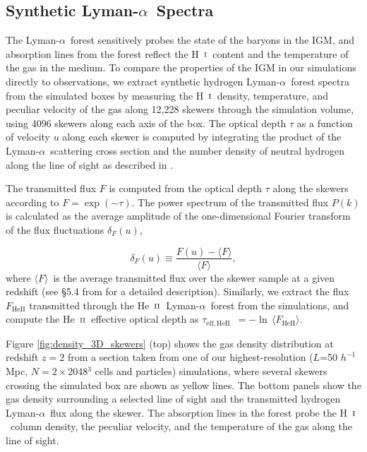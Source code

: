\documentclass[twocolumn]{aastex62}
\newcommand\Lya{Lyman-$\alpha$}
\def\HI{\hbox{\rm H~$\scriptstyle\rm I$}}
\def\HeII{\hbox{He~$\scriptstyle\rm II$}}
\newcommand\Fmean{$\langle F \rangle$~}
\newcommand\taueffHe{$\tau_{\mathrm{eff,HeII}}$~}
\begin{document}
\subsection{Synthetic \Lya\ Spectra }

The \Lya\ forest sensitively probes
the state of the baryons in the IGM, 
and
absorption lines from the forest reflect the \HI\ content and the temperature 
of the gas in the medium. To compare the properties of the IGM in our simulations directly to observations, we extract synthetic hydrogen \Lya\ forest spectra 
from the simulated boxes by measuring the \HI\ density, temperature, and peculiar velocity of the gas along 12,228 skewers through the simulation volume, 
using 4096 skewers along each axis of the box. The optical depth $\tau$ as a function of velocity $u$ along each skewer is computed by integrating the product 
of the \Lya\ scattering cross section and the number density of neutral hydrogen along the line of sight as described in \cite{villasenor2021a}.

The transmitted flux $F$ is computed from the optical depth $\tau$ along the skewers according to $F=\exp(-\tau)$. The power spectrum of the 
transmitted flux $P(k)$ is calculated as the average amplitude of the one-dimensional Fourier transform of the flux fluctuations $\delta_{F}(u)$, 

\begin{equation}
\delta_{F}(u) \equiv \frac{ F(u)- \langle F \rangle}{ \langle F \rangle }  ,
\label{eq:delta_F}
\end{equation}
\noindent
where \Fmean is the average transmitted flux over the skewer sample at a given redshift (see \S5.4 from \citealt{villasenor2021a}  for a detailed description). Similarly, we extract the flux $F_{\mathrm{HeII}}$
transmitted through the \HeII\ \Lya\ forest from the simulations, and compute the \HeII\ effective optical depth 
as \taueffHe$= - \ln \, \langle F_{\mathrm{HeII}} \rangle $.

Figure \ref{fig:density_3D_skewers} (top) shows the gas density distribution at redshift $z=2$ from a section taken from one of our highest-resolution 
($L$=50 $h^{-1}$Mpc, $N=2\times$2048$^3$ cells and particles) simulations, where several skewers crossing the simulated box are shown as yellow lines. 
The bottom panels show the gas density surrounding a selected line of sight and the transmitted hydrogen \Lya\ flux along the skewer. The absorption lines in the forest probe the \HI\ column density, the peculiar velocity, and the temperature of the gas along the line of sight.
 
\end{document}
